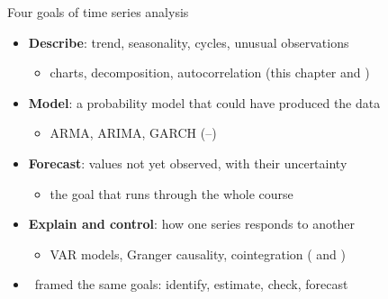 \begin{frame}{Four goals of time series analysis}
\itemsize{\small}
\begin{itemize}
    \item \textbf{Describe}: trend, seasonality, cycles, unusual observations
    \begin{itemize}
        \item charts, decomposition, autocorrelation (this chapter and )
    \end{itemize}
    \item \textbf{Model}: a probability model that could have produced the data
    \begin{itemize}
        \item ARMA, ARIMA, GARCH (--)
    \end{itemize}
    \item \textbf{Forecast}: values not yet observed, with their uncertainty
    \begin{itemize}
        \item the goal that runs through the whole course
    \end{itemize}
    \item \textbf{Explain and control}: how one series responds to another
    \begin{itemize}
        \item VAR models, Granger causality, cointegration ( and )
    \end{itemize}
    \item {}\ framed the same goals: identify, estimate, check, forecast
\end{itemize}
\end{frame}

